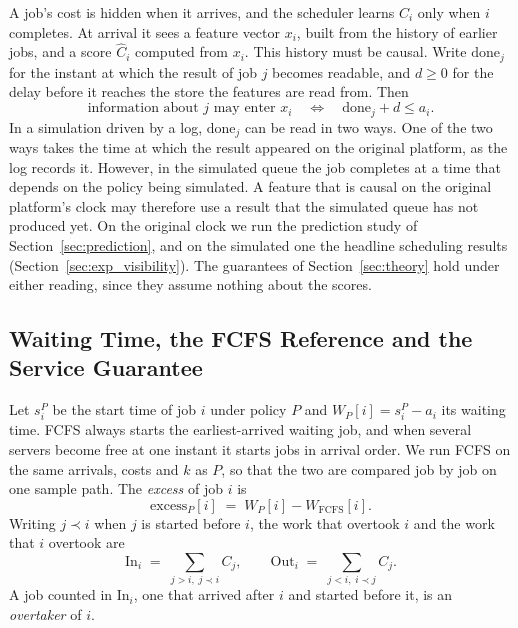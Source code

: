 A job's cost is hidden when it arrives, and the scheduler learns $C_i$ only when $i$
completes. At arrival it sees a feature vector $x_i$, built from the history of earlier
jobs, and a score $\hat C_i$ computed from $x_i$. This history must be causal. Write
$\mathrm{done}_j$ for the instant at which the result of job $j$ becomes readable, and
$d \ge 0$ for the delay before it reaches the store the features are read from. Then
\begin{equation}
  \text{information about } j \text{ may enter } x_i
  \quad\Longleftrightarrow\quad
  \mathrm{done}_j + d \le a_i .
  \label{eq:visibility}
\end{equation}
In a simulation driven by a log, $\mathrm{done}_j$ can be read in two ways. One of the two
ways takes the time at which the result appeared on the original platform, as the log
records it. However, in the simulated queue the job completes at a time that depends on the
policy being simulated. A feature that is
causal on the original platform's clock may therefore use a result that the simulated
queue has not produced yet. On the original clock we run the prediction study of
Section~\ref{sec:prediction}, and on the simulated one the headline scheduling results
(Section~\ref{sec:exp_visibility}). The guarantees of Section~\ref{sec:theory} hold under
either reading, since they assume nothing about the scores.

\subsection{Waiting Time, the FCFS Reference and the Service Guarantee}

Let $s^P_i$ be the start time of job $i$ under policy $P$ and $W_P[i] = s^P_i - a_i$ its
waiting time. FCFS always starts the earliest-arrived waiting job, and when several
servers become free at one instant it starts jobs in arrival order. We run FCFS on the same
arrivals, costs and $k$ as $P$, so that the two are compared job by job on one sample path.
The \emph{excess} of job $i$ is
\begin{equation}
  \mathrm{excess}_P[i] \;=\; W_P[i] - W_{\mathrm{FCFS}}[i] .
  \label{eq:excess}
\end{equation}
Writing $j \prec i$ when $j$ is started before $i$, the work that overtook $i$ and the
work that $i$ overtook are
\begin{equation}
  \mathrm{In}_i \;=\; \sum_{j > i,\; j \prec i} C_j ,
  \qquad
  \mathrm{Out}_i \;=\; \sum_{j < i,\; i \prec j} C_j .
  \label{eq:inout}
\end{equation}
A job counted in $\mathrm{In}_i$, one that arrived after $i$ and started before it, is an
\emph{overtaker} of $i$.

